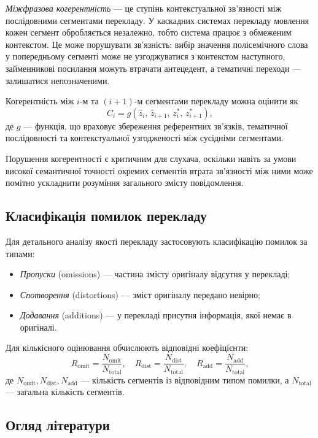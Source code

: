 \textit{Міжфразова когерентність} --- це ступінь контекстуальної зв'язності між
послідовними сегментами перекладу. У каскадних системах перекладу мовлення кожен
сегмент обробляється незалежно, тобто система працює з
обмеженим контекстом. Це може порушувати зв'язність: вибір
значення полісемічного слова у попередньому сегменті може не узгоджуватися з
контекстом наступного, займенникові посилання можуть втрачати антецедент, а
тематичні переходи --- залишатися непозначеними.

Когерентність між $i$-м та $(i+1)$-м сегментами перекладу можна оцінити як
\[
C_i = g(\hat{z}_i,\, \hat{z}_{i+1},\, z^*_i,\, z^*_{i+1}),
\]
де $g$ --- функція, що враховує збереження референтних зв'язків, тематичної
послідовності та контекстуальної узгодженості між сусідніми сегментами.

Порушення когерентності є критичним для слухача, оскільки навіть за умови
високої семантичної точності окремих сегментів втрата зв'язності між ними може
помітно ускладнити розуміння загального змісту повідомлення.

\subsection{Класифікація помилок перекладу}
\label{subsec:error_class}

Для детального аналізу якості перекладу застосовують класифікацію помилок за
типами:
\begin{itemize}[nosep]
    \item \textit{Пропуски} (omissions) --- частина змісту оригіналу відсутня у
    перекладі;
    \item \textit{Спотворення} (distortions) --- зміст оригіналу передано невірно;
    \item \textit{Додавання} (additions) --- у перекладі присутня інформація,
    якої немає в оригіналі.
\end{itemize}

Для кількісного оцінювання обчислюють відповідні коефіцієнти:
\[
R_{\text{omit}} = \frac{N_{\text{omit}}}{N_{\text{total}}}, \quad
R_{\text{dist}} = \frac{N_{\text{dist}}}{N_{\text{total}}}, \quad
R_{\text{add}} = \frac{N_{\text{add}}}{N_{\text{total}}},
\]
де $N_{\text{omit}}, N_{\text{dist}}, N_{\text{add}}$ --- кількість сегментів із
відповідним типом помилки, а $N_{\text{total}}$ --- загальна кількість сегментів.

\subsection{Огляд літератури}

